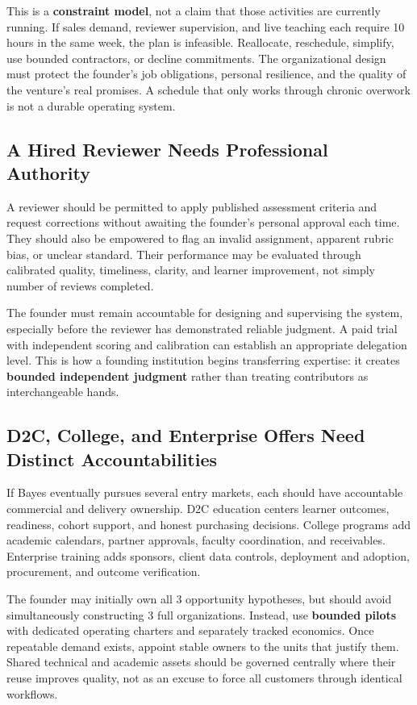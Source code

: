 This is a \textbf{constraint model}, not a claim that those activities are currently running. If sales demand, reviewer supervision, and live teaching each require 10 hours in the same week, the plan is infeasible. Reallocate, reschedule, simplify, use bounded contractors, or decline commitments. The organizational design must protect the founder's job obligations, personal resilience, and the quality of the venture's real promises. A schedule that only works through chronic overwork is not a durable operating system.

\subsection{A Hired Reviewer Needs Professional Authority}
\label{sec:bayes_reviewer_professional_authority}

A reviewer should be permitted to apply published assessment criteria and request corrections without awaiting the founder's personal approval each time. They should also be empowered to flag an invalid assignment, apparent rubric bias, or unclear standard. Their performance may be evaluated through calibrated quality, timeliness, clarity, and learner improvement, not simply number of reviews completed.

The founder must remain accountable for designing and supervising the system, especially before the reviewer has demonstrated reliable judgment. A paid trial with independent scoring and calibration can establish an appropriate delegation level. This is how a founding institution begins transferring expertise: it creates \textbf{bounded independent judgment} rather than treating contributors as interchangeable hands.

\subsection{D2C, College, and Enterprise Offers Need Distinct Accountabilities}
\label{sec:bayes_distinct_offer_accountabilities}

If Bayes eventually pursues several entry markets, each should have accountable commercial and delivery ownership. D2C education centers learner outcomes, readiness, cohort support, and honest purchasing decisions. College programs add academic calendars, partner approvals, faculty coordination, and receivables. Enterprise training adds sponsors, client data controls, deployment and adoption, procurement, and outcome verification.

The founder may initially own all 3 opportunity hypotheses, but should avoid simultaneously constructing 3 full organizations. Instead, use \textbf{bounded pilots} with dedicated operating charters and separately tracked economics. Once repeatable demand exists, appoint stable owners to the units that justify them. Shared technical and academic assets should be governed centrally where their reuse improves quality, not as an excuse to force all customers through identical workflows.

